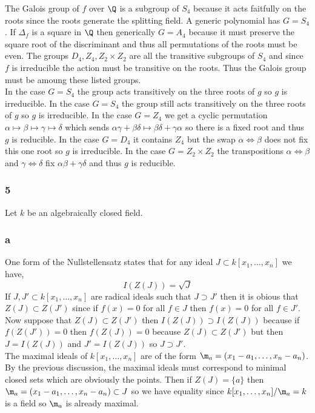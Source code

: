 \documentclass[12pt]{article}
\begin{document}
The Galois group of $f$ over $\Q$ is a subgroup of $S_4$ because it acts faitfully on the roots since the roots generate the splitting field. A generic polynomial has $G = S_4$. If $\Delta_f$ is a square in $\Q$ then generically $G = A_4$ because it must preserve the square root of the discriminant and thus all permutations of the roots must be even. The groups $D_4, Z_4, Z_2 \times Z_2$ are all the transitive subgroups of $S_4$ and since $f$ is irreducible the action must be transitive on the roots. Thus the Galois group must be amoung these listed groups.
\bigskip\\
In the case $G = S_4$ the group acts transitively on the three roots of $g$ so $g$ is irreducible. In the case $G = S_4$ the group still acts transitively on the three roots of $g$ so $g$ is irreducible. In the case $G = Z_4$ we get a cyclic permutation $\alpha \mapsto \beta \mapsto \gamma \mapsto \delta$ which sends $\alpha \gamma + \beta \delta \mapsto \beta \delta + \gamma \alpha$ so there is a fixed root and thus $g$ is reducible. In the case $G = D_4$ it contains $Z_4$ but the swap $\alpha \iff \beta$ does not fix this one root so $g$ is irreducible. In the case $G = Z_2 \times Z_2$ the transpositions $\alpha \iff \beta$ and $\gamma \iff \delta$ fix $\alpha \beta + \gamma \delta$ and thus $g$ is reducible.

\subsubsection{5}

Let $k$ be an algebraically closed field. 

\subsubsection{a}

One form of the Nullstellensatz states that for any ideal $J \subset k[x_1, \dots, x_n]$ we have,
\[ I(Z(J)) = \sqrt{J} \]
If $J, J' \subset k[x_1, \dots, x_n]$ are radical ideals such that $J \supset J'$ then it is obious that $Z(J) \subset Z(J')$ since if $f(x) = 0$ for all $f \in J$ then $f(x) = 0$ for all $f \in J'$. Now suppose that $Z(J) \subset Z(J')$ then $I(Z(J)) \supset I(Z(J))$ because if $f(Z(J')) = 0$ then $f(Z(J)) = 0$ because $Z(J) \subset Z(J')$ but then $J = I(Z(J))$ and $J' = I(Z(J))$ so $J \supset J'$.
\bigskip\\
The maximal ideals of $k[x_1, \dots, x_n]$ are of the form $\m_a = (x_1 - a_1, \dots, x_n - a_n)$. By the previous discussion, the maximal ideals must correspond to minimal closed sets which are obviously the points. Then if $Z(J) = \{ a \}$ then $\m_a = (x_1 - a_1, \dots, x_n - a_n) \subset J$ so we have equality since $k[x_1, \dots, x_n]/\m_a = k$ is a field so $\m_a$ is already maximal. 
\end{document}
